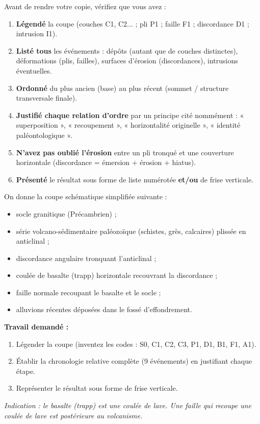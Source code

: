 \documentclass[11pt]{article}
\begin{document}
\begin{aretenir}
Avant de rendre votre copie, vérifiez que vous avez :
\begin{enumerate}
    \item \textbf{Légendé} la coupe (couches C1, C2... ; pli P1 ; faille F1 ; discordance D1 ; intrusion I1).
    \item \textbf{Listé tous} les événements : dépôts (autant que de couches distinctes), déformations (plis, failles), surfaces d'érosion (discordances), intrusions éventuelles.
    \item \textbf{Ordonné} du plus ancien (base) au plus récent (sommet / structure transversale finale).
    \item \textbf{Justifié chaque relation d'ordre} par un principe cité nommément : « superposition », « recoupement », « horizontalité originelle », « identité paléontologique ».
    \item \textbf{N'avez pas oublié l'érosion} entre un pli tronqué et une couverture horizontale (discordance = émersion + érosion + hiatus).
    \item \textbf{Présenté} le résultat sous forme de liste numérotée \textbf{et/ou} de frise verticale.
\end{enumerate}
\end{aretenir}

\begin{exercice}
On donne la coupe schématique simplifiée suivante :
\begin{itemize}
    \item socle granitique (Précambrien) ;
    \item série volcano-sédimentaire paléozoïque (schistes, grès, calcaires) plissée en anticlinal ;
    \item discordance angulaire tronquant l'anticlinal ;
    \item coulée de basalte (trapp) horizontale recouvrant la discordance ;
    \item faille normale recoupant le basalte et le socle ;
    \item alluvions récentes déposées dans le fossé d'effondrement.
\end{itemize}
\textbf{Travail demandé :}
\begin{enumerate}
    \item Légender la coupe (inventez les codes : S0, C1, C2, C3, P1, D1, B1, F1, A1).
    \item Établir la chronologie relative complète (9 événements) en justifiant chaque étape.
    \item Représenter le résultat sous forme de frise verticale.
\end{enumerate}
\emph{Indication : le basalte (trapp) est une coulée de lave. Une faille qui recoupe une coulée de lave est postérieure au volcanisme.}
\end{exercice}
\end{document}
